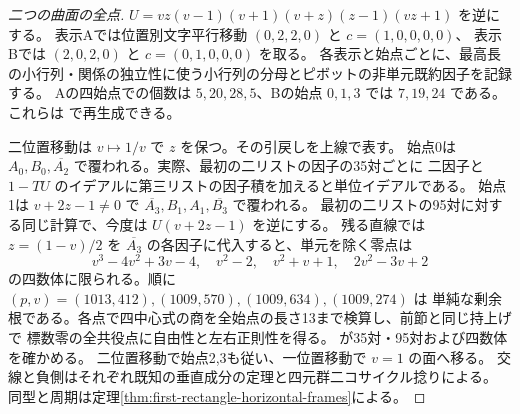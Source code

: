 \begin{proof}[二つの曲面の全点]
$U=vz(v-1)(v+1)(v+z)(z-1)(vz+1)$ を逆にする。
表示Aでは位置別文字平行移動 $(0,2,2,0)$ と $c=(1,0,0,0,0)$、
表示Bでは $(2,0,2,0)$ と $c=(0,1,0,0,0)$ を取る。
各表示と始点ごとに、最高長の小行列・関係の独立性に使う小行列の分母とピボットの非単元既約因子を記録する。
Aの四始点での個数は $5,20,28,5$、Bの始点 $0,1,3$ では $7,19,24$ である。
これらは で再生成できる。

二位置移動は $v\mapsto1/v$ で $z$ を保つ。その引戻しを上線で表す。
始点0は $A_0,B_0,\overline{A_2}$ で覆われる。実際、最初の二リストの因子の35対ごとに
二因子と $1-TU$ のイデアルに第三リストの因子積を加えると単位イデアルである。
始点1は $v+2z-1\ne0$ で $\overline{A_3},B_1,A_1,\overline{B_3}$ で覆われる。
最初の二リストの95対に対する同じ計算で、今度は $U(v+2z-1)$ を逆にする。
残る直線では $z=(1-v)/2$ を $\overline{A_3}$ の各因子に代入すると、単元を除く零点は
\[
 v^3-4v^2+3v-4,\quad v^2-2,\quad v^2+v+1,\quad 2v^2-3v+2
\]
の四数体に限られる。順に $(p,v)=(1013,412),(1009,570),(1009,634),(1009,274)$ は
単純な剰余根である。各点で四中心式の商を全始点の長さ13まで検算し、前節と同じ持上げで
標数零の全共役点に自由性と左右正則性を得る。
 が35対・95対および四数体を確かめる。
二位置移動で始点2,3も従い、一位置移動で $v=1$ の面へ移る。
交線と負側はそれぞれ既知の垂直成分の定理と四元群二コサイクル捻りによる。
同型と周期は定理\ref{thm:first-rectangle-horizontal-frames}による。
\end{proof}
